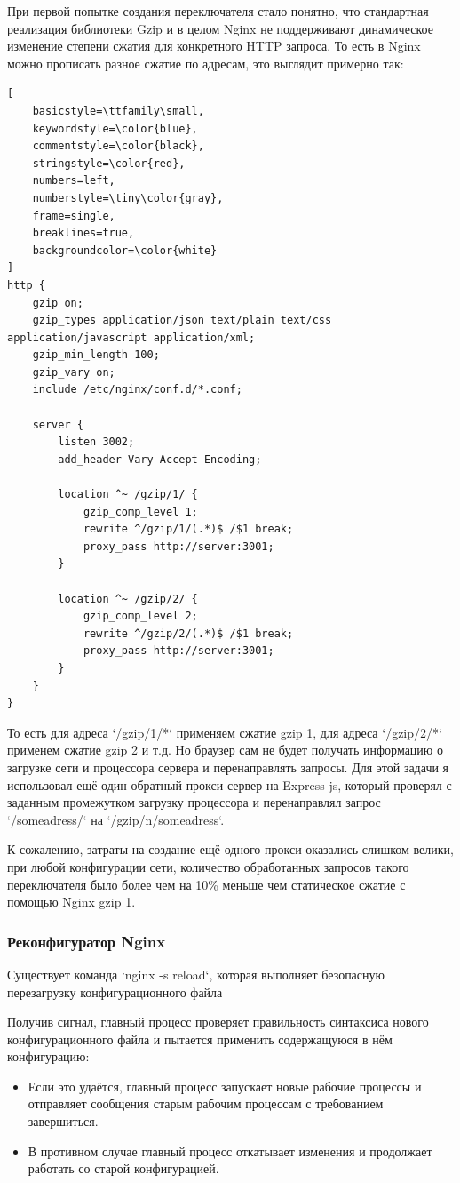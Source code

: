 \documentclass[12pt]{article}
\begin{document}
При первой попытке создания переключателя стало понятно, что стандартная реализация библиотеки Gzip и в целом Nginx не поддерживают динамическое изменение степени сжатия для конкретного HTTP запроса. То есть в Nginx можно прописать разное сжатие по адресам, это выглядит примерно так:

\begin{lstlisting}[
    basicstyle=\ttfamily\small,
    keywordstyle=\color{blue},
    commentstyle=\color{black},
    stringstyle=\color{red},
    numbers=left,
    numberstyle=\tiny\color{gray},
    frame=single,
    breaklines=true,
    backgroundcolor=\color{white}
]
http {
    gzip on;
    gzip_types application/json text/plain text/css application/javascript application/xml;
    gzip_min_length 100;
    gzip_vary on;
    include /etc/nginx/conf.d/*.conf;

    server {
        listen 3002;
        add_header Vary Accept-Encoding;

        location ^~ /gzip/1/ {
            gzip_comp_level 1;
            rewrite ^/gzip/1/(.*)$ /$1 break;
            proxy_pass http://server:3001;
        }

        location ^~ /gzip/2/ {
            gzip_comp_level 2;
            rewrite ^/gzip/2/(.*)$ /$1 break;
            proxy_pass http://server:3001;
        }
    }
}
\end{lstlisting}

То есть для адреса `/gzip/1/*` применяем сжатие gzip 1, для адреса `/gzip/2/*` применем сжатие gzip 2 и т.д. Но браузер сам не будет получать информацию о загрузке сети и процессора сервера и перенаправлять запросы. Для этой задачи я использовал ещё один обратный прокси сервер на Express js, который проверял с заданным промежутком загрузку процессора и перенаправлял запрос `/someadress/` на `/gzip/n/someadress`.

К сожалению, затраты на создание ещё одного прокси оказались слишком велики, при любой конфигурации сети,
количество обработанных запросов такого переключателя было более чем на 10\% меньше чем статическое сжатие с помощью Nginx gzip 1.

\subsubsection{Реконфигуратор Nginx }

Существует команда `nginx -s reload`, которая выполняет безопасную перезагрузку конфигурационного файла

Получив сигнал, главный процесс проверяет правильность синтаксиса нового конфигурационного файла и пытается применить содержащуюся в нём конфигурацию:
\begin{itemize}
    \item Если это удаётся, главный процесс запускает новые рабочие процессы и отправляет сообщения старым рабочим процессам с требованием завершиться.
    \item В противном случае главный процесс откатывает изменения и продолжает работать со старой конфигурацией.
\end{itemize}
\end{document}
